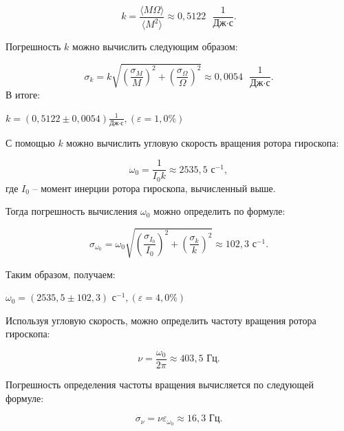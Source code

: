 \documentclass[a4paper, 12pt]{article}
\begin{document}
\begin{center}
\begin{equation}
k = \frac{\langle M\Omega\rangle}{\langle M^2 \rangle} \approx 0,5122 \text{ } \frac{1}{\text{Дж} \cdot \text{с}}.
\end{equation}

Погрешность $ k $ можно вычислить следующим образом:

\begin{equation}
\sigma_k = k\sqrt{\left( \frac{\sigma_M}{M} \right)^2+\left(\frac{\sigma_\Omega}{\Omega} \right)^2} \approx 0,0054 \text{ } \frac{1}{\text{Дж} \cdot \text{с}}.
\end{equation}
В итоге: 

\bigskip
\underline{$ k =\left( 0,5122 \pm 0,0054 \right) \frac{1}{\text{Дж} \cdot \text{с}} , \left( \varepsilon = 1,0 \% \right) $} 
\bigskip

С помощью $ k $ можно вычислить угловую скорость вращения ротора гироскопа:

\begin{equation}
\omega_0 = \frac{1}{I_0 k} \approx 2535,5 \text{ с}^{-1},
\end{equation}
где $ I_0 $ -- момент инерции ротора гироскопа, вычисленный выше.

Тогда погрешность вычисления $ \omega_0 $ можно определить по формуле:

\begin{equation}
\sigma_{\omega_0} = \omega_0 \sqrt{\left( \frac{\sigma_{I_0}}{I_0} \right)^2 + \left( \frac{\sigma_k}{k} \right)^2} \approx 102,3 \text{ с}^{-1}.
\end{equation}

Таким образом, получаем:
\bigskip

	 \underline{$ \omega_0 =\left( 2535,5 \pm 102,3 \right) \text{ с}^{-1} ,  \left( \varepsilon = 4,0 \% \right) $}

\bigskip

Используя угловую скорость, можно определить частоту вращения ротора гироскопа:

\begin{equation}
\nu = \frac{\omega_0}{2\pi} \approx 403,5 \text{ Гц}.
\end{equation}

Погрешность определения частоты вращения вычисляется по следующей формуле:

\begin{equation}
\sigma_\nu = \nu \varepsilon_{\omega_0} \approx 16,3 \text{ Гц}.
\end{equation}


\end{center}
\end{document}

